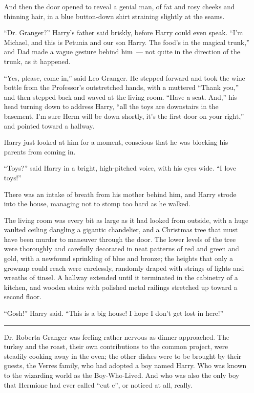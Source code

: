 And then the door opened to reveal a genial man, of fat and rosy cheeks and thinning hair, in a blue button-down shirt straining slightly at the seams.

``Dr. Granger?'' Harry's father said briskly, before Harry could even speak. ``I'm Michael, and this is Petunia and our son Harry. The food's in the magical trunk,'' and Dad made a vague gesture behind him~--- not quite in the direction of the trunk, as it happened.

``Yes, please, come in,'' said Leo Granger. He stepped forward and took the wine bottle from the Professor's outstretched hands, with a muttered ``Thank you,'' and then stepped back and waved at the living room. ``Have a seat. And,'' his head turning down to address Harry, ``all the toys are downstairs in the basement, I'm sure Herm will be down shortly, it's the first door on your right,'' and pointed toward a hallway.

Harry just looked at him for a moment, conscious that he was blocking his parents from coming in.

``Toys?'' said Harry in a bright, high-pitched voice, with his eyes wide. ``I love toys!''

There was an intake of breath from his mother behind him, and Harry strode into the house, managing not to stomp too hard as he walked.

The living room was every bit as large as it had looked from outside, with a huge vaulted ceiling dangling a gigantic chandelier, and a Christmas tree that must have been murder to maneuver through the door. The lower levels of the tree were thoroughly and carefully decorated in neat patterns of red and green and gold, with a newfound sprinkling of blue and bronze; the heights that only a grownup could reach were carelessly, randomly draped with strings of lights and wreaths of tinsel. A hallway extended until it terminated in the cabinetry of a kitchen, and wooden stairs with polished metal railings stretched up toward a second floor.

``Gosh!'' Harry said. ``This is a big house! I hope I don't get lost in here!''

\begin{center}\rule{3in}{0.4pt}\end{center}

Dr. Roberta Granger was feeling rather nervous as dinner approached. The turkey and the roast, their own contributions to the common project, were steadily cooking away in the oven; the other dishes were to be brought by their guests, the Verres family, who had adopted a boy named Harry. Who was known to the wizarding world as the Boy-Who-Lived. And who was also the only boy that Hermione had ever called ``cut e'', or noticed at all, really.

